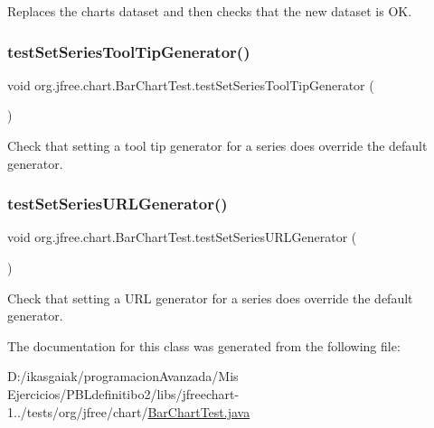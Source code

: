 Replaces the chart\textquotesingle{}s dataset and then checks that the new dataset is OK. \mbox{\label{classorg_1_1jfree_1_1chart_1_1_bar_chart_test_abb90ba031ff8ba226d48ae1813bedfce}} 
\subsubsection{\texorpdfstring{test\+Set\+Series\+Tool\+Tip\+Generator()}{testSetSeriesToolTipGenerator()}}
{\footnotesize\ttfamily void org.\+jfree.\+chart.\+Bar\+Chart\+Test.\+test\+Set\+Series\+Tool\+Tip\+Generator (\begin{DoxyParamCaption}{ }\end{DoxyParamCaption})}

Check that setting a tool tip generator for a series does override the default generator. \mbox{\label{classorg_1_1jfree_1_1chart_1_1_bar_chart_test_afc653d2f2069c9ddb75a3d4bd41f2961}} 
\subsubsection{\texorpdfstring{test\+Set\+Series\+U\+R\+L\+Generator()}{testSetSeriesURLGenerator()}}
{\footnotesize\ttfamily void org.\+jfree.\+chart.\+Bar\+Chart\+Test.\+test\+Set\+Series\+U\+R\+L\+Generator (\begin{DoxyParamCaption}{ }\end{DoxyParamCaption})}

Check that setting a U\+RL generator for a series does override the default generator. 

The documentation for this class was generated from the following file\+:\begin{DoxyCompactItemize}
\item 
D\+:/ikasgaiak/programacion\+Avanzada/\+Mis Ejercicios/\+P\+B\+Ldefinitibo2/libs/jfreechart-\/1../tests/org/jfree/chart/\mbox{\hyperlink{_bar_chart_test_8java}{Bar\+Chart\+Test.\+java}}\end{DoxyCompactItemize}
